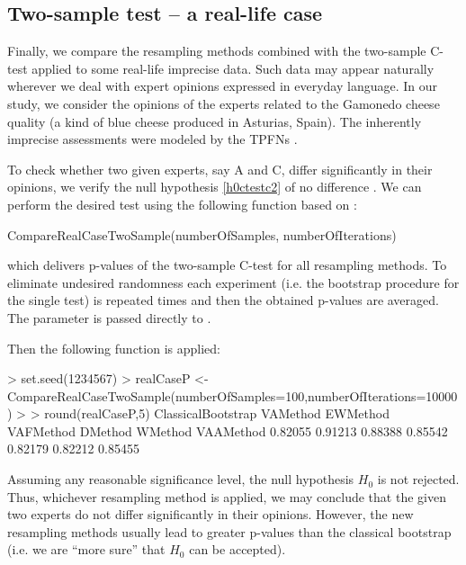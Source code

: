 

\subsection{Two-sample test -- a real-life case}

Finally, we compare the resampling methods combined with the two-sample C-test applied to some real-life imprecise data. Such data may appear naturally wherever we deal with expert opinions expressed in everyday language. In our study, we consider the opinions of the experts related to the Gamonedo cheese quality (a kind of blue cheese produced in Asturias, Spain). The inherently imprecise assessments were modeled by the TPFNs \citep{ramos2019}.

To check whether two given experts, say A and C, differ significantly in their opinions, we verify the null hypothesis \eqref{h0ctestc2} of no difference \citep{grzegorzewski_amcs2020}. We can perform the desired test using the following function based on :
\begin{example}
CompareRealCaseTwoSample(numberOfSamples, numberOfIterations)
\end{example}
which delivers p-values of the two-sample C-test for all resampling methods.
To eliminate undesired randomness each experiment (i.e. the bootstrap procedure for the single test) is repeated  times and then the obtained p-values are averaged.
The parameter  is passed directly to .

Then the following function is applied:
\begin{example}
> set.seed(1234567)
> realCaseP <- CompareRealCaseTwoSample(numberOfSamples=100,numberOfIterations=10000)
> 
> round(realCaseP,5)
     ClassicalBootstrap VAMethod EWMethod VAFMethod DMethod WMethod VAAMethod
     0.82055            0.91213  0.88388  0.85542   0.82179 0.82212 0.85455
\end{example}
Assuming any reasonable significance level, the null hypothesis $H_0$ is not rejected. Thus, whichever resampling method is applied, we may conclude that the given two experts do not differ significantly in their opinions.
However, the new resampling methods usually lead to greater p-values than the classical bootstrap (i.e. we are ``more sure'' that $H_0$ can be accepted).




